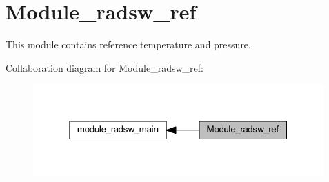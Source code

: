 \hypertarget{group__module__radsw__ref}{}\section{Module\+\_\+radsw\+\_\+ref}
\label{group__module__radsw__ref}


This module contains reference temperature and pressure.  


Collaboration diagram for Module\+\_\+radsw\+\_\+ref\+:\nopagebreak
\begin{figure}[H]
\begin{center}
\leavevmode
\includegraphics[width=316pt]{group__module__radsw__ref}
\end{center}
\end{figure}
